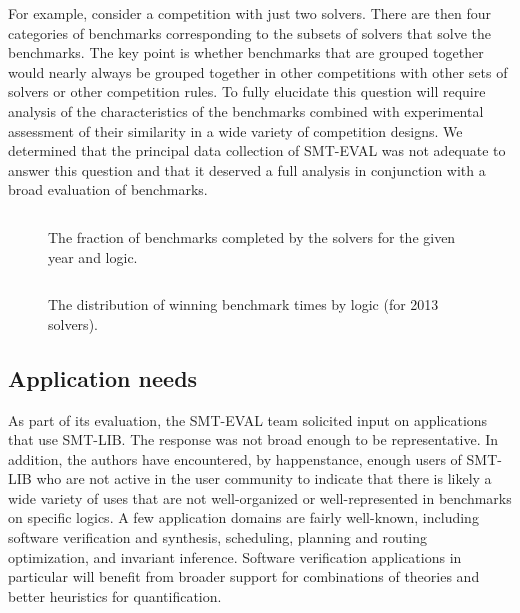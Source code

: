 \documentclass[smallcondensed]{svjour3}
\begin{document}
For example, consider a competition with just two solvers. There are then four categories of benchmarks corresponding to the subsets of solvers that solve the
benchmarks. The key point is whether benchmarks that are grouped together would nearly always be grouped together in other competitions with other sets of solvers or other competition rules. To fully elucidate this question will require analysis of the characteristics of the benchmarks combined with 
experimental assessment of their similarity in a wide variety of competition designs. We determined that the principal data collection of SMT-EVAL was not adequate to answer this question and that it deserved a full analysis in 
conjunction with a broad evaluation of benchmarks.

\begin{figure}
\centering
\begin{tabular}{|l|r|rrrr|rrrr|}
\hline

\end{tabular}
\caption{The fraction of benchmarks completed by the solvers for the given year and logic.}
\label{Fig:completion}
\end{figure}

\begin{figure}
\centering
\begin{tabular}{|l|r|rrrr|}
\hline

\hline
\end{tabular}
\caption{The distribution of winning benchmark times by logic (for 2013 solvers).}
\label{Fig:quintiles}
\end{figure}

\subsection{Application needs}
\label{Applications}

As part of its evaluation, the SMT-EVAL team solicited input on applications that use SMT-LIB. The response was not broad enough to be representative. In addition, the authors 
have encountered, by happenstance, enough users of SMT-LIB who are not active in the user community to indicate that there is likely a wide variety of uses that are not well-organized or well-represented in benchmarks on specific logics. A few application domains are fairly well-known, including software verification and synthesis, scheduling, planning and routing optimization, and invariant inference. Software verification applications in particular will benefit from broader support for combinations of theories and better heuristics for quantification. 
\end{document}
